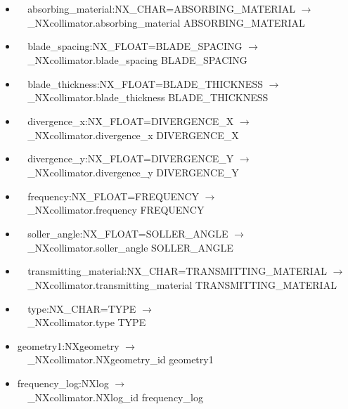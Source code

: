 \documentclass[11pt]{article}
\begin{document}
{{\begin{itemize}
\item{\verb|  |absorbing\_material:NX\_CHAR=ABSORBING\_MATERIAL $\rightarrow$\\
\verb|  |\_NXcollimator.absorbing\_material ABSORBING\_MATERIAL}

\item{\verb|  |blade\_spacing:NX\_FLOAT=BLADE\_SPACING $\rightarrow$\\
\verb|  |\_NXcollimator.blade\_spacing BLADE\_SPACING}

\item{\verb|  |blade\_thickness:NX\_FLOAT=BLADE\_THICKNESS $\rightarrow$\\
\verb|  |\_NXcollimator.blade\_thickness BLADE\_THICKNESS}

\item{\verb|  |divergence\_x:NX\_FLOAT=DIVERGENCE\_X $\rightarrow$\\
\verb|  |\_NXcollimator.divergence\_x DIVERGENCE\_X}

\item{\verb|  |divergence\_y:NX\_FLOAT=DIVERGENCE\_Y $\rightarrow$\\
\verb|  |\_NXcollimator.divergence\_y DIVERGENCE\_Y}

\item{\verb|  |frequency:NX\_FLOAT=FREQUENCY $\rightarrow$\\
\verb|  |\_NXcollimator.frequency FREQUENCY}

\item{\verb|  |soller\_angle:NX\_FLOAT=SOLLER\_ANGLE $\rightarrow$\\
\verb|  |\_NXcollimator.soller\_angle SOLLER\_ANGLE}

\item{\verb|  |transmitting\_material:NX\_CHAR=TRANSMITTING\_MATERIAL $\rightarrow$\\
\verb|  |\_NXcollimator.transmitting\_material TRANSMITTING\_MATERIAL}

\item{\verb|  |type:NX\_CHAR=TYPE $\rightarrow$\\
\verb|  |\_NXcollimator.type TYPE}

\item{geometry1:NXgeometry $\rightarrow$\\
\verb|  |\_NXcollimator.NXgeometry\_id geometry1}

\item{frequency\_log:NXlog $\rightarrow$\\
\verb|  |\_NXcollimator.NXlog\_id frequency\_log}
\end{itemize}

}}
\end{document}
